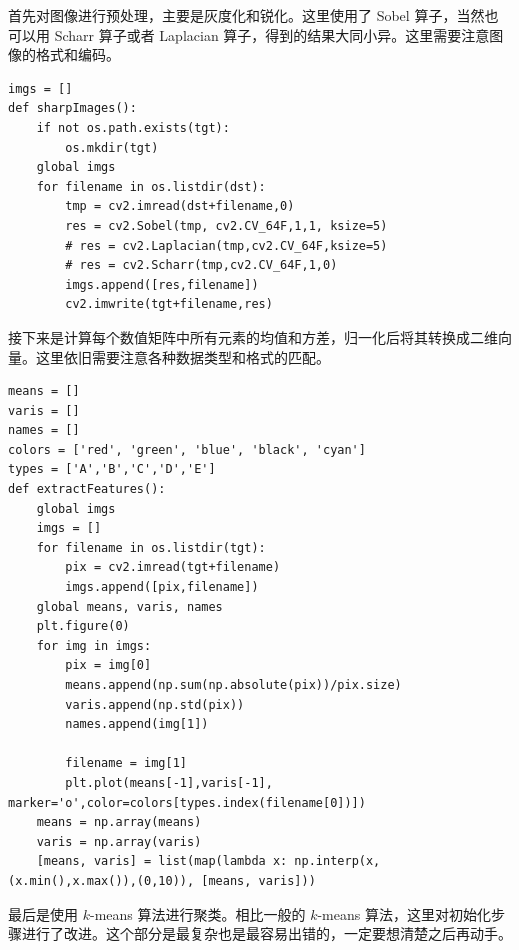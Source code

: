 \documentclass[a4paper, 12pt]{article}
\begin{document}
首先对图像进行预处理，主要是灰度化和锐化。这里使用了 Sobel 算子，当然也可以用 Scharr 算子或者 Laplacian 算子，得到的结果大同小异。这里需要注意图像的格式和编码。

\begin{lstlisting}[style=myPython,caption={图像的灰度化和锐化}]
imgs = []
def sharpImages():
    if not os.path.exists(tgt): 
        os.mkdir(tgt)
    global imgs
    for filename in os.listdir(dst):
        tmp = cv2.imread(dst+filename,0)
        res = cv2.Sobel(tmp, cv2.CV_64F,1,1, ksize=5)
        # res = cv2.Laplacian(tmp,cv2.CV_64F,ksize=5)
        # res = cv2.Scharr(tmp,cv2.CV_64F,1,0)
        imgs.append([res,filename])
        cv2.imwrite(tgt+filename,res)
\end{lstlisting}

接下来是计算每个数值矩阵中所有元素的均值和方差，归一化后将其转换成二维向量。这里依旧需要注意各种数据类型和格式的匹配。

\begin{lstlisting}[style=myPython,caption={计算每个数值矩阵中所有元素的均值和方差}]
means = []
varis = []
names = []
colors = ['red', 'green', 'blue', 'black', 'cyan']
types = ['A','B','C','D','E']
def extractFeatures():
    global imgs
    imgs = []
    for filename in os.listdir(tgt):
        pix = cv2.imread(tgt+filename)
        imgs.append([pix,filename])
    global means, varis, names
    plt.figure(0)
    for img in imgs:
        pix = img[0]
        means.append(np.sum(np.absolute(pix))/pix.size)
        varis.append(np.std(pix))
        names.append(img[1])

        filename = img[1]
        plt.plot(means[-1],varis[-1], marker='o',color=colors[types.index(filename[0])])
    means = np.array(means)
    varis = np.array(varis)
    [means, varis] = list(map(lambda x: np.interp(x, (x.min(),x.max()),(0,10)), [means, varis]))
\end{lstlisting}

最后是使用 $k$-means 算法进行聚类。相比一般的 $k$-means 算法，这里对初始化步骤进行了改进。这个部分是最复杂也是最容易出错的，一定要想清楚之后再动手。
\end{document}
